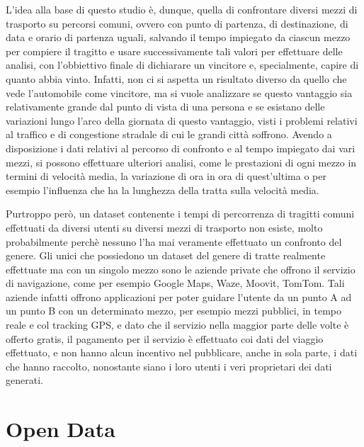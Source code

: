 L'idea alla base di questo studio è, dunque, quella di confrontare diversi mezzi di trasporto su percorsi comuni, ovvero con punto di partenza, di destinazione, di data e orario di partenza uguali, salvando il tempo impiegato da ciascun mezzo per compiere il tragitto e usare successivamente tali valori per effettuare delle analisi, con l'obbiettivo finale di dichiarare un vincitore e, specialmente, capire di quanto abbia vinto. Infatti, non ci si aspetta un risultato diverso da quello che vede l'automobile come vincitore, ma si vuole analizzare se questo vantaggio sia relativamente grande dal punto di vista di una persona e se esistano delle variazioni lungo l'arco della giornata di questo vantaggio, visti i problemi relativi al traffico e di congestione stradale di cui le grandi città soffrono. Avendo a disposizione i dati relativi al percorso di confronto e al tempo impiegato dai vari mezzi, si possono effettuare ulteriori analisi, come le prestazioni di ogni mezzo in termini di velocità media, la variazione di ora in ora di quest'ultima o per esempio l'influenza che ha la lunghezza della tratta sulla velocità media.

Purtroppo però, un dataset contenente i tempi di percorrenza di tragitti comuni effettuati da diversi utenti su diversi mezzi di trasporto non esiste, molto probabilmente perchè nessuno l'ha mai veramente effettuato un confronto del genere. Gli unici che possiedono un dataset del genere di tratte realmente effettuate ma con un singolo mezzo sono le aziende private che offrono il servizio di navigazione, come per esempio Google Maps, Waze, Moovit, TomTom. Tali aziende infatti offrono applicazioni per poter guidare l'utente da un punto A ad un punto B con un determinato mezzo, per esempio mezzi pubblici, in tempo reale e col tracking GPS, e dato che il servizio nella maggior parte delle volte è offerto gratis, il pagamento per il servizio è effettuato coi dati del viaggio effettuato, e non hanno alcun incentivo nel pubblicare, anche in sola parte, i dati che hanno raccolto, nonostante siano i loro utenti i veri proprietari dei dati generati.

\section{Open Data}

